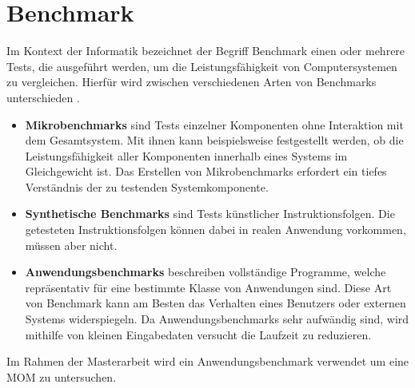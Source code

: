 \section{Benchmark}
Im Kontext der Informatik bezeichnet der Begriff Benchmark einen oder mehrere Tests, die ausgeführt werden, um die Leistungsfähigkeit von Computersystemen zu vergleichen. Hierfür wird zwischen verschiedenen Arten von Benchmarks unterschieden \cite{Lilja2004}. 
\begin{itemize}
\item \textbf{Mikrobenchmarks} sind Tests einzelner Komponenten ohne Interaktion mit dem Gesamtsystem. Mit ihnen kann beispielsweise festgestellt werden, ob die Leistungsfähigkeit aller Komponenten innerhalb eines Systems im Gleichgewicht ist. Das Erstellen von Mikrobenchmarks erfordert ein tiefes Verständnis der zu testenden Systemkomponente.

\item \textbf{Synthetische Benchmarks} sind Tests künstlicher Instruktionsfolgen. Die getesteten Instruktionsfolgen können dabei in realen Anwendung vorkommen, müssen aber nicht.

\item \textbf{Anwendungsbenchmarks} beschreiben vollständige Programme, welche repräsentativ für eine bestimmte Klasse von Anwendungen sind. Diese Art von Benchmark kann am Besten das Verhalten eines Benutzers oder externen Systems widerspiegeln. Da Anwendungsbenchmarks sehr aufwändig sind, wird mithilfe von kleinen Eingabedaten versucht die Laufzeit zu reduzieren.
\end{itemize}
Im Rahmen der Masterarbeit wird ein Anwendungsbenchmark verwendet um eine MOM zu untersuchen.




